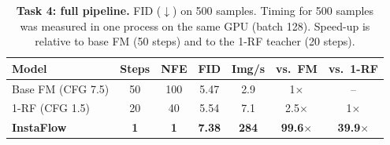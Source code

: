 \begin{table}[t]
  \centering
  \footnotesize
  \setlength{\tabcolsep}{2.5pt}
  \caption{\textbf{Task 4: full pipeline.} FID ($\downarrow$) on 500 samples. Timing for 500 samples was measured in one process on the same GPU (batch 128). Speed-up is relative to base FM (50 steps) and to the 1-RF teacher (20 steps).}
  \label{tab:task4}
  \begin{tabular}{@{}lcccccc@{}}
    \toprule
    Model & Steps & NFE & FID & Img/s & vs.\ FM & vs.\ 1-RF \\
    \midrule
    Base FM (CFG 7.5)  & 50 & 100 & 5.47 & 2.9 & 1$\times$ & -- \\
    1-RF (CFG 1.5)     & 20 & 40  & 5.54 & 7.1 & 2.5$\times$ & 1$\times$ \\
    \textbf{InstaFlow} & \textbf{1} & \textbf{1} & \textbf{7.38} & \textbf{284} & \textbf{99.6$\times$} & \textbf{39.9$\times$} \\
    \bottomrule
  \end{tabular}
\end{table}
